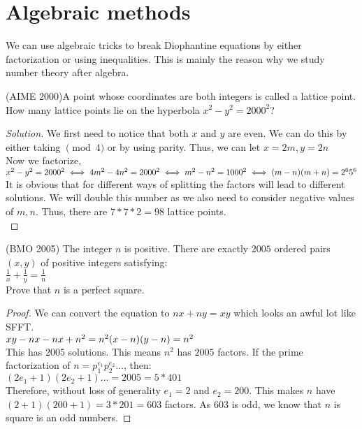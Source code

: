 \section{Algebraic methods}
We can use algebraic tricks to break Diophantine equations by either factorization or using inequalities. This is mainly the reason why we study number theory after algebra.\\
\begin{example}
    (AIME 2000)A point whose coordinates are both integers is called a lattice point. How many lattice points lie on the hyperbola $x^2 - y^2 = 2000^2$?
\end{example}
\begin{proof}
    [Solution]
    We first need to notice that both $x$ and $y$ are even. We can do this by either taking $\pmod{4}$ or by using parity. Thus, we can let $x=2m, y=2n$\\
Now we factorize, $x^2-y^2=2000^2 \iff 4m^2-4n^2=2000^2 \iff m^2-n^2=1000^2 \\
\iff (m-n)(m+n)=2^6 5^6$\\
It is obvious that for different ways of splitting the factors will lead to different solutions. We will double this number as we also need to consider negative values of $m,n$. Thus, there are $7*7*2=98$ lattice points.\\
\end{proof}
\begin{example}
(BMO 2005)
    The integer $n$ is positive. There are exactly $2005$ ordered pairs $(x, y)$ of positive integers satisfying:\\
    $\frac{1}{x}+\frac{1}{y}=\frac{1}{n}$\\
    Prove that $n$ is a perfect square.
\end{example}
\begin{proof}
    We can convert the equation to $nx+ny=xy$ which looks an awful lot like SFFT.\\
    $xy-nx-nx+n^2=n^2\\
    (x-n)(y-n)=n^2$\\
    This has $2005$ solutions. This means $n^2$ has $2005$ factors. If the prime factorization of $n=p_1^{e_1}p_2^{e_2}\dots$, then:\\
    $(2e_1+1)(2e_2+1)\dots=2005=5*401$\\
    Therefore, without loss of generality $e_1=2$ and $e_2=200$. This makes $n$ have $(2+1)(200+1)=3*201=603$ factors. As $603$ is odd, we know that $n$ is square is an odd numbers.
\end{proof}
